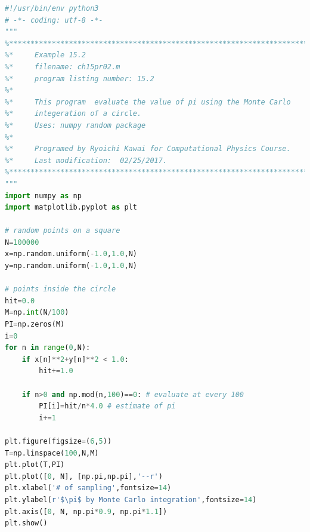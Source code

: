\bigskip
\noindent
\program
\footnotesize
\begin{lstlisting}[language=python]
#!/usr/bin/env python3
# -*- coding: utf-8 -*-
"""
%**************************************************************************
%*     Example 15.2                                                       *
%*     filename: ch15pr02.m                                               *
%*     program listing number: 15.2                                       *
%*                                                                        *
%*     This program  evaluate the value of pi using the Monte Carlo       *
%*     integeration of a circle.                                          *
%*     Uses: numpy random package                                         *
%*                                                                        *
%*     Programed by Ryoichi Kawai for Computational Physics Course.       *
%*     Last modification:  02/25/2017.                                    *
%**************************************************************************
"""
import numpy as np
import matplotlib.pyplot as plt

# random points on a square
N=100000
x=np.random.uniform(-1.0,1.0,N)
y=np.random.uniform(-1.0,1.0,N)

# points inside the circle
hit=0.0
M=np.int(N/100)
PI=np.zeros(M)
i=0
for n in range(0,N):
    if x[n]**2+y[n]**2 < 1.0:
        hit+=1.0
        
    if n>0 and np.mod(n,100)==0: # evaluate at every 100 
        PI[i]=hit/n*4.0 # estimate of pi
        i+=1

plt.figure(figsize=(6,5))
T=np.linspace(100,N,M)
plt.plot(T,PI)
plt.plot([0, N], [np.pi,np.pi],'--r')
plt.xlabel('# of sampling',fontsize=14)
plt.ylabel(r'$\pi$ by Monte Carlo integration',fontsize=14)
plt.axis([0, N, np.pi*0.9, np.pi*1.1])
plt.show()
\end{lstlisting}
\normalsize

